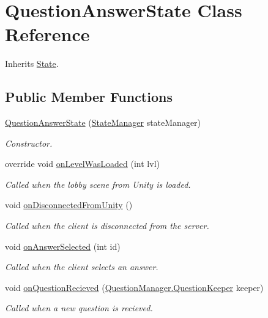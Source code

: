 \hypertarget{class_question_answer_state}{\section{Question\-Answer\-State Class Reference}
\label{class_question_answer_state}
}


Inherits \hyperlink{class_state}{State}.

\subsection*{Public Member Functions}
\begin{DoxyCompactItemize}
\item 
\hyperlink{class_question_answer_state_aaa4c9ebbc85591128de07018f4021b7a}{Question\-Answer\-State} (\hyperlink{class_state_manager}{State\-Manager} state\-Manager)
\begin{DoxyCompactList}\small\item\em Constructor.\end{DoxyCompactList}\item 
override void \hyperlink{class_question_answer_state_a412ceb42ff866a69f4d7c0c5f64b63e6}{on\-Level\-Was\-Loaded} (int lvl)
\begin{DoxyCompactList}\small\item\em Called when the lobby scene from Unity is loaded.\end{DoxyCompactList}\item 
void \hyperlink{class_question_answer_state_a87ef00fb4d3a2b3b53929863e8215490}{on\-Disconnected\-From\-Unity} ()
\begin{DoxyCompactList}\small\item\em Called when the client is disconnected from the server.\end{DoxyCompactList}\item 
void \hyperlink{class_question_answer_state_a195aebf2f3a31d5602d7fa5f9f45ad12}{on\-Answer\-Selected} (int id)
\begin{DoxyCompactList}\small\item\em Called when the client selects an answer.\end{DoxyCompactList}\item 
void \hyperlink{class_question_answer_state_ac7a6adbb459814a9811a56f9e797e815}{on\-Question\-Recieved} (\hyperlink{class_question_manager_1_1_question_keeper}{Question\-Manager.\-Question\-Keeper} keeper)
\begin{DoxyCompactList}\small\item\em Called when a new question is recieved.\end{DoxyCompactList}\item 

\end{DoxyCompactItemize}
